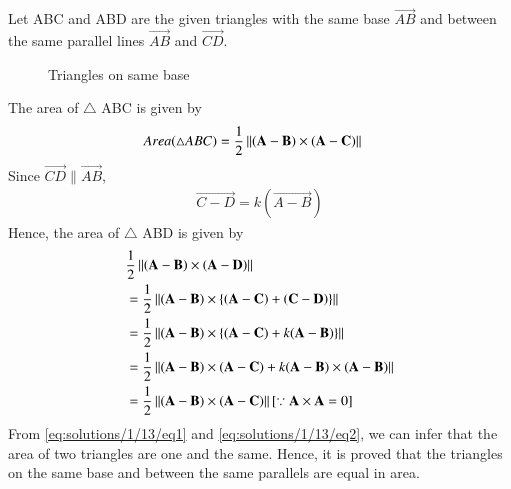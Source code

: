Let ABC and ABD are the given triangles with the same base $\vec{AB}$ and between the same parallel lines $\vec{AB}$ and $\vec{CD}$.
\begin{figure}[!ht] \label{fig:two_triangles}
\centering
\resizebox{\columnwidth}{!}{}
\caption{Triangles on same base}
\end{figure}

The area of $\triangle$ ABC is given by
\begin{align} 
	  Area(\triangle ABC) &= \frac{1}{2}\left\lVert(\mathbf{A} - \mathbf{B}) \times (\mathbf{A} - \mathbf{C})\right\rVert\label{eq:solutions/1/13/eq1}
\end{align}
Since $\vec{CD} \parallel \vec{AB}$,
\begin{align}\label{eq:solutions/1/13/fact1} \vec{C-D} = k(\vec{A-B})\end{align}
Hence, the area of $\triangle$ ABD is given by
\begin{align}
&\frac{1}{2}\left\lVert\left(\mathbf{A}-\mathbf{B}\right) \times \left(\mathbf{A}-\mathbf{D}\right)\right\rVert\\ 
&=\frac{1}{2}\left\lVert(\mathbf{A}-\mathbf{B}) \times \left\{\left(\mathbf{A}-\mathbf{C}\right) + \left(\mathbf{C}-\mathbf{D}\right)\right\}\right\rVert\\
&=\frac{1}{2}\left\lVert(\mathbf{A}-\mathbf{B}) \times  \left\{(\mathbf{A}-\mathbf{C}) + k(\mathbf{A}-\mathbf{B})\right\}\right\rVert\\
&=\frac{1}{2}\left\lVert(\mathbf{A}-\mathbf{B})\times(\mathbf{A}-\mathbf{C})+k(\mathbf{A}-\mathbf{B})\times (\mathbf{A}-\mathbf{B})\right\rVert\\
&=\frac{1}{2}\left\lVert(\mathbf{A}-\mathbf{B})\times(\mathbf{A} - \mathbf{C})\right\rVert[\because \mathbf{A} \times \mathbf{A} =0] \label{eq:solutions/1/13/eq2}
\end{align}
From \eqref{eq:solutions/1/13/eq1} and \eqref{eq:solutions/1/13/eq2}, we can infer that the area of two triangles are one and the same.
Hence, it is proved that the triangles on the same base and between the same parallels are equal in area.
